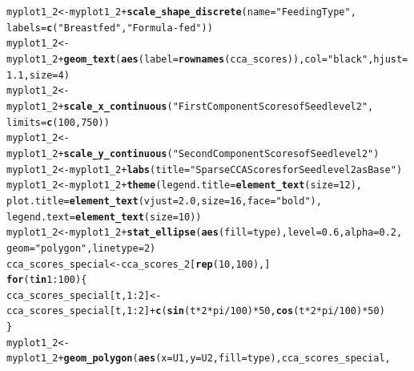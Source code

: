 \documentclass[12pt]{article}\usepackage[]{graphicx}\usepackage[]{color}
\makeatletter
\newcommand{\hlnum}[1]{\textcolor[rgb]{0.686,0.059,0.569}{#1}}%
\newcommand{\hlstr}[1]{\textcolor[rgb]{0.192,0.494,0.8}{#1}}%
\newcommand{\hlopt}[1]{\textcolor[rgb]{0,0,0}{#1}}%
\newcommand{\hlstd}[1]{\textcolor[rgb]{0.345,0.345,0.345}{#1}}%
\newcommand{\hlkwa}[1]{\textcolor[rgb]{0.161,0.373,0.58}{\textbf{#1}}}%
\newcommand{\hlkwb}[1]{\textcolor[rgb]{0.69,0.353,0.396}{#1}}%
\newcommand{\hlkwc}[1]{\textcolor[rgb]{0.333,0.667,0.333}{#1}}%
\newcommand{\hlkwd}[1]{\textcolor[rgb]{0.737,0.353,0.396}{\textbf{#1}}}%
\newenvironment{kframe}{%
 \def\at@end@of@kframe{}%
 \ifinner\ifhmode%
  \def\at@end@of@kframe{\end{minipage}}%
  \begin{minipage}{\columnwidth}%
 \fi\fi%
 \def\FrameCommand##1{\hskip\@totalleftmargin \hskip-\fboxsep
 \colorbox{shadecolor}{##1}\hskip-\fboxsep
     \hskip-\linewidth \hskip-\@totalleftmargin \hskip\columnwidth}%
 \MakeFramed {\advance\hsize-\width
   \@totalleftmargin\z@ \linewidth\hsize
   \@setminipage}}%
 {\par\unskip\endMakeFramed%
 \at@end@of@kframe}
\newenvironment{knitrout}{}{} %
\makeatother
\begin{document}
\begin{knitrout}
\begin{kframe}
\begin{alltt}
\hlstd{myplot1_2}\hlkwb{<-}\hlstd{myplot1_2}\hlopt{+}\hlkwd{scale_shape_discrete}\hlstd{(}\hlkwc{name}\hlstd{=}\hlstr{"Feeding Type"}\hlstd{,}
                                      \hlkwc{labels}\hlstd{=}\hlkwd{c}\hlstd{(}\hlstr{"Breastfed"}\hlstd{,}\hlstr{"Formula-fed"}\hlstd{))}
\hlstd{myplot1_2}\hlkwb{<-}\hlstd{myplot1_2}\hlopt{+}\hlkwd{geom_text}\hlstd{(}\hlkwd{aes}\hlstd{(}\hlkwc{label}\hlstd{=}\hlkwd{rownames}\hlstd{(cca_scores)),}\hlkwc{col}\hlstd{=}\hlstr{"black"}\hlstd{,}\hlkwc{hjust}\hlstd{=}\hlnum{1.1}\hlstd{,}\hlkwc{size}\hlstd{=}\hlnum{4}\hlstd{)}
\hlstd{myplot1_2}\hlkwb{<-}\hlstd{myplot1_2}\hlopt{+}\hlkwd{scale_x_continuous}\hlstd{(}\hlstr{"First Component Scores of Seedlevel2"}\hlstd{,}
                                        \hlkwc{limits}\hlstd{=}\hlkwd{c}\hlstd{(}\hlnum{100}\hlstd{,}\hlnum{750}\hlstd{))}
\hlstd{myplot1_2}\hlkwb{<-}\hlstd{myplot1_2}\hlopt{+}\hlkwd{scale_y_continuous}\hlstd{(}\hlstr{"Second Component Scores of Seedlevel2"}\hlstd{)}
\hlstd{myplot1_2}\hlkwb{<-}\hlstd{myplot1_2}\hlopt{+}\hlkwd{labs}\hlstd{(}\hlkwc{title}\hlstd{=}\hlstr{"Sparse CCA Scores for Seedlevel2 as Base"}\hlstd{)}
\hlstd{myplot1_2}\hlkwb{<-}\hlstd{myplot1_2}\hlopt{+}\hlkwd{theme}\hlstd{(}\hlkwc{legend.title} \hlstd{=} \hlkwd{element_text}\hlstd{(}\hlkwc{size}\hlstd{=}\hlnum{12}\hlstd{),}
                       \hlkwc{plot.title} \hlstd{=} \hlkwd{element_text}\hlstd{(}\hlkwc{vjust}\hlstd{=}\hlnum{2.0}\hlstd{,}\hlkwc{size}\hlstd{=}\hlnum{16}\hlstd{,} \hlkwc{face}\hlstd{=}\hlstr{"bold"}\hlstd{),}
                       \hlkwc{legend.text}\hlstd{=}\hlkwd{element_text}\hlstd{(}\hlkwc{size}\hlstd{=}\hlnum{10}\hlstd{))}
\hlstd{myplot1_2}\hlkwb{<-}\hlstd{myplot1_2}\hlopt{+}\hlkwd{stat_ellipse}\hlstd{(}\hlkwd{aes}\hlstd{(}\hlkwc{fill}\hlstd{=type),}\hlkwc{level}\hlstd{=}\hlnum{0.6}\hlstd{,}\hlkwc{alpha}\hlstd{=}\hlnum{0.2}\hlstd{,}
                                  \hlkwc{geom}\hlstd{=}\hlstr{"polygon"}\hlstd{,}\hlkwc{linetype}\hlstd{=}\hlnum{2}\hlstd{)}
\hlstd{cca_scores_special}\hlkwb{<-}\hlstd{cca_scores_2[}\hlkwd{rep}\hlstd{(}\hlnum{10}\hlstd{,}\hlnum{100}\hlstd{),]}
\hlkwa{for}\hlstd{(t} \hlkwa{in} \hlnum{1}\hlopt{:}\hlnum{100}\hlstd{)\{}
 \hlstd{cca_scores_special[t,}\hlnum{1}\hlopt{:}\hlnum{2}\hlstd{]}\hlkwb{<-}\hlstd{cca_scores_special[t,}\hlnum{1}\hlopt{:}\hlnum{2}\hlstd{]}\hlopt{+}\hlkwd{c}\hlstd{(}\hlkwd{sin}\hlstd{(t}\hlopt{*}\hlnum{2}\hlopt{*}\hlstd{pi}\hlopt{/}\hlnum{100}\hlstd{)}\hlopt{*}\hlnum{50}\hlstd{,}\hlkwd{cos}\hlstd{(t}\hlopt{*}\hlnum{2}\hlopt{*}\hlstd{pi}\hlopt{/}\hlnum{100}\hlstd{)}\hlopt{*}\hlnum{50}\hlstd{)}
\hlstd{\}}
\hlstd{myplot1_2}\hlkwb{<-}\hlstd{myplot1_2}\hlopt{+}\hlkwd{geom_polygon}\hlstd{(}\hlkwd{aes}\hlstd{(}\hlkwc{x}\hlstd{=U1,}\hlkwc{y}\hlstd{=U2,}\hlkwc{fill}\hlstd{=type),cca_scores_special,}

\end{alltt}
\end{kframe}
\end{knitrout}
\end{document}
